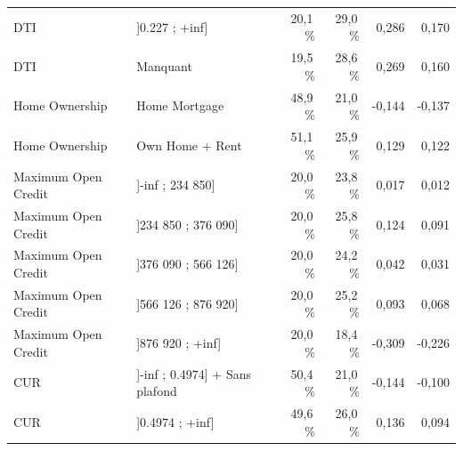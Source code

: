 \begin{tabular}{llrrrr}
DTI & ]0.227 ; +inf] & 20,1\,\% & 29,0\,\% & 0,286 & 0,170 \\
DTI & Manquant & 19,5\,\% & 28,6\,\% & 0,269 & 0,160 \\
Home Ownership & Home Mortgage & 48,9\,\% & 21,0\,\% & -0,144 & -0,137 \\
Home Ownership & Own Home + Rent & 51,1\,\% & 25,9\,\% & 0,129 & 0,122 \\
Maximum Open Credit & ]-inf ; 234 850] & 20,0\,\% & 23,8\,\% & 0,017 & 0,012 \\
Maximum Open Credit & ]234 850 ; 376 090] & 20,0\,\% & 25,8\,\% & 0,124 & 0,091 \\
Maximum Open Credit & ]376 090 ; 566 126] & 20,0\,\% & 24,2\,\% & 0,042 & 0,031 \\
Maximum Open Credit & ]566 126 ; 876 920] & 20,0\,\% & 25,2\,\% & 0,093 & 0,068 \\
Maximum Open Credit & ]876 920 ; +inf] & 20,0\,\% & 18,4\,\% & -0,309 & -0,226 \\
CUR & ]-inf ; 0.4974] + Sans plafond & 50,4\,\% & 21,0\,\% & -0,144 & -0,100 \\
CUR & ]0.4974 ; +inf] & 49,6\,\% & 26,0\,\% & 0,136 & 0,094 \\
\bottomrule
\end{tabular}
